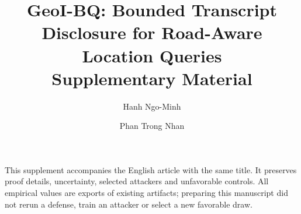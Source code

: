 \documentclass[11pt,a4paper]{article}
\title{GeoI-BQ: Bounded Transcript Disclosure for Road-Aware Location Queries\\
\large Supplementary Material}
\author{Hanh Ngo-Minh \and Phan Trong Nhan}
\date{}
\begin{document}
\maketitle
\noindent This supplement accompanies the English article with the same title.
It preserves proof details, uncertainty, selected attackers and unfavorable controls.
All empirical values are exports of existing artifacts; preparing this manuscript
did not rerun a defense, train an attacker or select a new favorable draw.
\tableofcontents


\end{document}
